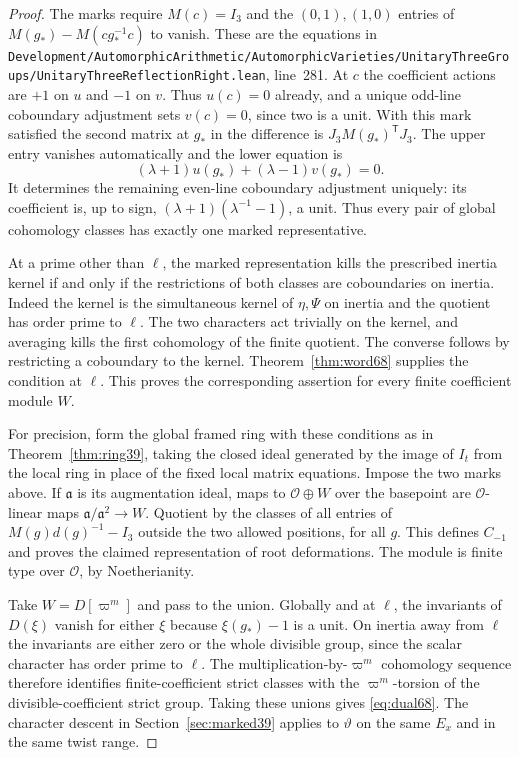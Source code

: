 \documentclass[a4paper,11pt]{article}
\theoremstyle{definition}
\theoremstyle{remark}
\newcommand{\srcloc}[2]{{\small\nolinkurl{#1.lean}}, line~#2}
\numberwithin{equation}{section}
\newcommand{\OO}{\mathcal O}
\begin{document}
\begin{proof}
The marks require \(M(c)=I_3\) and the \((0,1),(1,0)\) entries of
\(M(g_*)-M(cg_*^{-1}c)\) to vanish. These are the equations in
\srcloc{Development/AutomorphicArithmetic/AutomorphicVarieties/UnitaryThreeGroups/UnitaryThreeReflectionRight}{281}.
At \(c\) the coefficient actions are \(+1\) on \(u\) and \(-1\)
on \(v\). Thus \(u(c)=0\) already, and a unique odd-line
coboundary adjustment sets \(v(c)=0\), since two is a unit.
With this mark satisfied the second matrix at \(g_*\) in the
difference is \(J_3 M(g_*)^{\mathsf T}J_3\). The upper
entry vanishes automatically and the lower equation is
\[
              (\lambda+1)u(g_*)+(\lambda-1)v(g_*)=0 .
\]
It determines the remaining even-line coboundary adjustment
uniquely: its coefficient is, up to sign,
\((\lambda+1)(\lambda^{-1}-1)\), a unit. Thus every pair of
global cohomology classes has exactly one marked representative.

At a prime other than \(\ell\), the marked representation kills
the prescribed inertia kernel if and only if the restrictions of
both classes are coboundaries on inertia. Indeed the kernel is
the simultaneous kernel of \(\eta,\Psi\) on inertia and the
quotient has order prime to \(\ell\). The two characters act
trivially on the kernel, and averaging kills the first cohomology
of the finite quotient. The converse follows by restricting a
coboundary to the kernel. Theorem~\ref{thm:word68} supplies the
condition at \(\ell\). This proves the corresponding assertion for
every finite coefficient module \(W\).

For precision, form the global framed ring with these conditions
as in Theorem~\ref{thm:ring39}, taking the closed ideal generated
by the image of \(I_t\) from the local ring in place of the fixed
local matrix equations. Impose the two marks above. If
\(\mathfrak a\) is its augmentation ideal, maps to \(\OO\oplus W\)
over the basepoint are \(\OO\)-linear maps
\(\mathfrak a/\mathfrak a^2\to W\). Quotient by the classes of
all entries of \(M(g)d(g)^{-1}-I_3\) outside the two allowed
positions, for all \(g\). This defines \(C_{-1}\) and proves
the claimed representation of root deformations. The module
is finite type over \(\OO\), by Noetherianity.

Take \(W=D[\varpi^m]\) and pass to the union. Globally and
at \(\ell\), the invariants of \(D(\xi)\) vanish for either
\(\xi\) because \(\xi(g_*)-1\) is a unit. On inertia away
from \(\ell\) the invariants are either zero or the whole
divisible group, since the scalar character has order prime
to \(\ell\). The multiplication-by-\(\varpi^m\) cohomology
sequence therefore identifies finite-coefficient strict classes
with the \(\varpi^m\)-torsion of the divisible-coefficient
strict group. Taking these unions gives \eqref{eq:dual68}.
The character descent in Section~\ref{sec:marked39} applies
to \(\vartheta\) on the same \(E_x\) and in the same twist range.
\end{proof}
\end{document}
